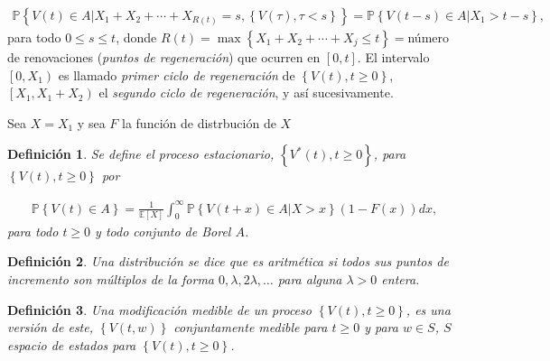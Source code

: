 \documentclass{article}
\newtheorem{Def}{Definición}[section]
\newcommand{\esp}{\mathbb{E}}
\newcommand{\prob}{\mathbb{P}}
\numberwithin{equation}{section}
\begin{document}
{\begin{eqnarray*}
\prob\left\{V\left(t\right)\in A|X_{1}+X_{2}+\cdots+X_{R\left(t\right)}=s,\left\{V\left(\tau\right),\tau<s\right\}\right\}=\prob\left\{V\left(t-s\right)\in A|X_{1}>t-s\right\},
\end{eqnarray*}
para todo $0\leq s\leq t$, donde $R\left(t\right)=\max\left\{X_{1}+X_{2}+\cdots+X_{j}\leq t\right\}=$n\'umero de renovaciones ({\emph{puntos de regeneraci\'on}}) que ocurren en $\left[0,t\right]$. El intervalo $\left[0,X_{1}\right)$ es llamado {\emph{primer ciclo de regeneraci\'on}} de $\left\{V\left(t \right),t\geq0\right\}$, $\left[X_{1},X_{1}+X_{2}\right)$ el {\emph{segundo ciclo de regeneraci\'on}}, y as\'i sucesivamente.

Sea $X=X_{1}$ y sea $F$ la funci\'on de distrbuci\'on de $X$


\begin{Def}
Se define el proceso estacionario, $\left\{V^{*}\left(t\right),t\geq0\right\}$, para $\left\{V\left(t\right),t\geq0\right\}$ por

\begin{eqnarray*}
\prob\left\{V\left(t\right)\in A\right\}=\frac{1}{\esp\left[X\right]}\int_{0}^{\infty}\prob\left\{V\left(t+x\right)\in A|X>x\right\}\left(1-F\left(x\right)\right)dx,
\end{eqnarray*} 
para todo $t\geq0$ y todo conjunto de Borel $A$.
\end{Def}

\begin{Def}
Una distribuci\'on se dice que es {\emph{aritm\'etica}} si todos sus puntos de incremento son m\'ultiplos de la forma $0,\lambda, 2\lambda,\ldots$ para alguna $\lambda>0$ entera.
\end{Def}


\begin{Def}
Una modificaci\'on medible de un proceso $\left\{V\left(t\right),t\geq0\right\}$, es una versi\'on de este, $\left\{V\left(t,w\right)\right\}$ conjuntamente medible para $t\geq0$ y para $w\in S$, $S$ espacio de estados para $\left\{V\left(t\right),t\geq0\right\}$.
\end{Def}

}
\end{document}
